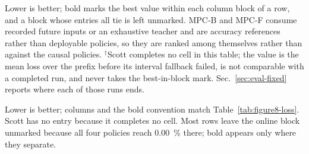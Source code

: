 \documentclass[letterpaper, 10 pt, conference]{ieeeconf}  %
\newcommand{\tablenote}[1]{%
  \par\vspace{3pt}%
  \begin{minipage}{\linewidth}\footnotesize\raggedright #1\end{minipage}%
}
\begin{document}
\begin{table}[t]
  \centering
  \caption{Approximation loss $\overline{L}$ on the controlled figure-eight traces}
  \label{tab:figure8-loss}
  \footnotesize
  \setlength{\tabcolsep}{3pt}
  
  \tablenote{
    Lower is better; bold marks the best value within each column block of a
        row, and a block whose entries all tie is left unmarked. MPC-B and MPC-F
        consume recorded future inputs or an exhaustive teacher and are accuracy
        references rather than deployable policies, so they are ranked among
        themselves rather than against the causal policies.
        $^{\dagger}$Scott completes no cell in this table; the value is the mean
        loss over the prefix before its interval fallback failed, is not
        comparable with a completed run, and never takes the best-in-block mark.
        Sec.~\ref{sec:eval-fixed} reports where each of those runs ends.
  }
\end{table}

\begin{table}[t]
  \centering
  \caption{False-positive rate (\%) on the controlled figure-eight traces}
  \label{tab:figure8-fpr}
  \small
  \setlength{\tabcolsep}{4pt}
  
  \tablenote{
    Lower is better; columns and the bold convention match
        Table~\ref{tab:figure8-loss}. Scott has no entry because it completes no
        cell. Most rows leave the online block unmarked
        because all four policies reach \SI{0.00}{\percent} there; bold appears
        only where they separate.
  }
\end{table}

\printbibliography
\end{document}
